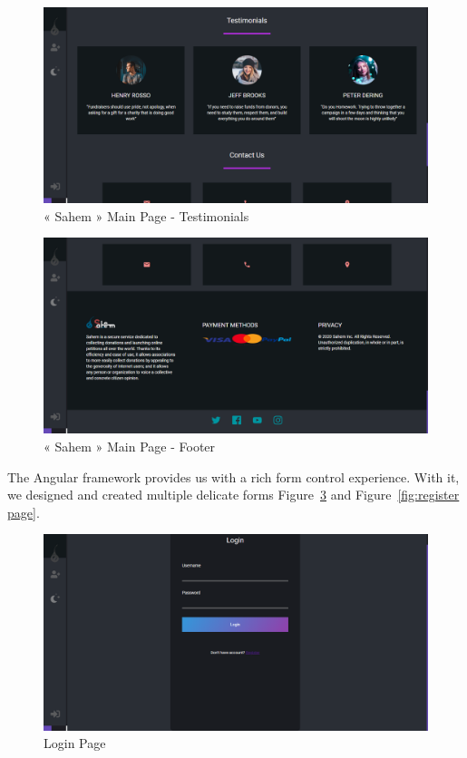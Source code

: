  \begin{figure}[H]
      \centering
      \includegraphics[scale=0.45]{assets/screen-main-test.png}
      \caption{« Sahem » Main Page - Testimonials}

      \label{fig:testimonials}
\end{figure}
\begin{figure}[H]
      \centering
      \includegraphics[scale=0.45]{assets/screen-main-foot.png}
      \caption{« Sahem » Main Page - Footer}

      \label{fig:footer}
\end{figure}






The Angular framework provides us with a rich form control experience. With it, we designed and created multiple delicate forms Figure~\ref{fig:login page} and Figure~\ref{fig:register page}. 
\begin{figure}[H]
      \centering
      \includegraphics[scale=0.45]{assets/screen-login.png}
      \caption{Login Page}
      \label{fig:login page}
\end{figure}

